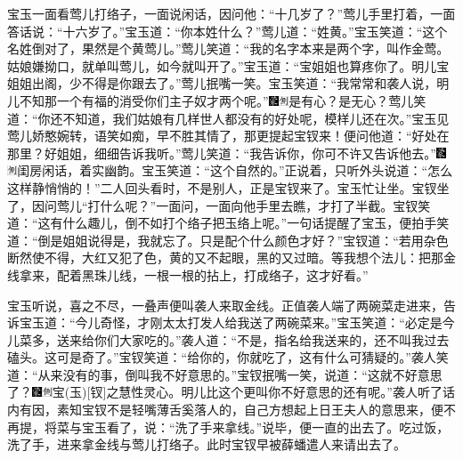 宝玉一面看莺儿打络子，一面说闲话，因问他：“十几岁了？”莺儿手里打着，一面答话说：“十六岁了。”宝玉道：“你本姓什么？”莺儿道：“姓黄。”宝玉笑道：“这个名姓倒对了，果然是个黄莺儿。”莺儿笑道：“我的名字本来是两个字，叫作金莺。姑娘嫌拗口，就单叫莺儿，如今就叫开了。”宝玉道：“宝姐姐也算疼你了。明儿宝姐姐出阁，少不得是你跟去了。”莺儿抿嘴一笑。宝玉笑道：“我常常和袭人说，明儿不知那一个有福的消受你们主子奴才两个呢。”{\includegraphics[width=3mm]{../Images/00006}\includegraphics[width=3mm]{../Images/00011}\footnotesize \kaishu 是有心？是无心？}莺儿笑道：“你还不知道，我们姑娘有几样世人都没有的好处呢，模样儿还在次。”宝玉见莺儿娇憨婉转，语笑如痴，早不胜其情了，那更提起宝钗来！便问他道：“好处在那里？好姐姐，细细告诉我听。”莺儿笑道：“我告诉你，你可不许又告诉他去。”{\includegraphics[width=3mm]{../Images/00006}\includegraphics[width=3mm]{../Images/00011}\footnotesize \kaishu 闺房闲话，着实幽韵。}宝玉笑道：“这个自然的。”正说着，只听外头说道：“怎么这样静悄悄的！”二人回头看时，不是别人，正是宝钗来了。宝玉忙让坐。宝钗坐了，因问莺儿“打什么呢？”一面问，一面向他手里去瞧，才打了半截。宝钗笑道：“这有什么趣儿，倒不如打个络子把玉络上呢。”一句话提醒了宝玉，便拍手笑道：“倒是姐姐说得是，我就忘了。只是配个什么颜色才好？”宝钗道：“若用杂色断然使不得，大红又犯了色，黄的又不起眼，黑的又过暗。等我想个法儿：把那金线拿来，配着黑珠儿线，一根一根的拈上，打成络子，这才好看。”

宝玉听说，喜之不尽，一叠声便叫袭人来取金线。正值袭人端了两碗菜走进来，告诉宝玉道：“今儿奇怪，才刚太太打发人给我送了两碗菜来。”宝玉笑道：“必定是今儿菜多，送来给你们大家吃的。”袭人道：“不是，指名给我送来的，还不叫我过去磕头。这可是奇了。”宝钗笑道：“给你的，你就吃了，这有什么可猜疑的。”袭人笑道：“从来没有的事，倒叫我不好意思的。”宝钗抿嘴一笑，说道：“这就不好意思了？{\includegraphics[width=3mm]{../Images/00006}\includegraphics[width=3mm]{../Images/00011}\footnotesize \kaishu 宝{(玉)}{[}钗{]}之慧性灵心。}明儿比这个更叫你不好意思的还有呢。”袭人听了话内有因，素知宝钗不是轻嘴薄舌奚落人的，自己方想起上日王夫人的意思来，便不再提，将菜与宝玉看了，说：“洗了手来拿线。”说毕，便一直的出去了。吃过饭，洗了手，进来拿金线与莺儿打络子。此时宝钗早被薛蟠遣人来请出去了。

